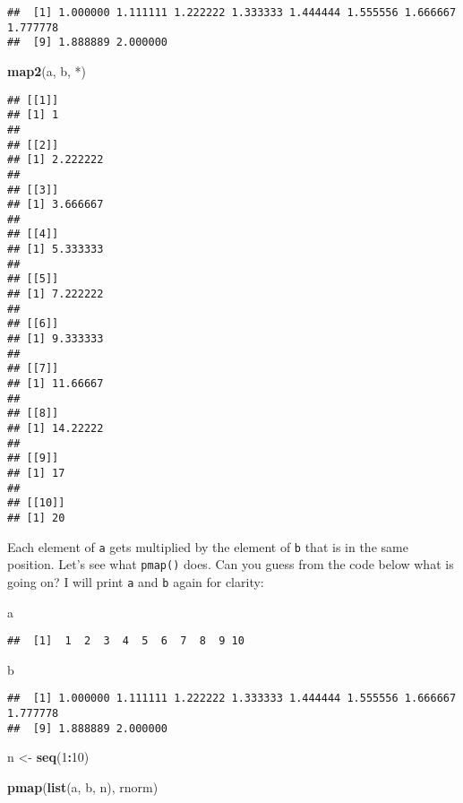 \documentclass[
]{article}
\newenvironment{Shaded}{\begin{snugshade}}{\end{snugshade}}
\newcommand{\DataTypeTok}[1]{\textcolor[rgb]{0.13,0.29,0.53}{#1}}
\newcommand{\DecValTok}[1]{\textcolor[rgb]{0.00,0.00,0.81}{#1}}
\newcommand{\KeywordTok}[1]{\textcolor[rgb]{0.13,0.29,0.53}{\textbf{#1}}}
\newcommand{\NormalTok}[1]{#1}
\newcommand{\OperatorTok}[1]{\textcolor[rgb]{0.81,0.36,0.00}{\textbf{#1}}}
\newcommand{\StringTok}[1]{\textcolor[rgb]{0.31,0.60,0.02}{#1}}
\begin{document}
\begin{verbatim}
##  [1] 1.000000 1.111111 1.222222 1.333333 1.444444 1.555556 1.666667 1.777778
##  [9] 1.888889 2.000000
\end{verbatim}

\begin{Shaded}
\begin{Highlighting}[]
\KeywordTok{map2}\NormalTok{(a, b, }\StringTok{\textasciigrave{}}\DataTypeTok{*}\StringTok{\textasciigrave{}}\NormalTok{)}
\end{Highlighting}
\end{Shaded}

\begin{verbatim}
## [[1]]
## [1] 1
## 
## [[2]]
## [1] 2.222222
## 
## [[3]]
## [1] 3.666667
## 
## [[4]]
## [1] 5.333333
## 
## [[5]]
## [1] 7.222222
## 
## [[6]]
## [1] 9.333333
## 
## [[7]]
## [1] 11.66667
## 
## [[8]]
## [1] 14.22222
## 
## [[9]]
## [1] 17
## 
## [[10]]
## [1] 20
\end{verbatim}

Each element of \texttt{a} gets multiplied by the element of \texttt{b} that is in the same position.
Let's see what \texttt{pmap()} does. Can you guess from the code below what is going on? I will print
\texttt{a} and \texttt{b} again for clarity:

\begin{Shaded}
\begin{Highlighting}[]
\NormalTok{a}
\end{Highlighting}
\end{Shaded}

\begin{verbatim}
##  [1]  1  2  3  4  5  6  7  8  9 10
\end{verbatim}

\begin{Shaded}
\begin{Highlighting}[]
\NormalTok{b}
\end{Highlighting}
\end{Shaded}

\begin{verbatim}
##  [1] 1.000000 1.111111 1.222222 1.333333 1.444444 1.555556 1.666667 1.777778
##  [9] 1.888889 2.000000
\end{verbatim}

\begin{Shaded}
\begin{Highlighting}[]
\NormalTok{n \textless{}{-}}\StringTok{ }\KeywordTok{seq}\NormalTok{(}\DecValTok{1}\OperatorTok{:}\DecValTok{10}\NormalTok{)}

\KeywordTok{pmap}\NormalTok{(}\KeywordTok{list}\NormalTok{(a, b, n), rnorm)}
\end{Highlighting}
\end{Shaded}
\end{document}
